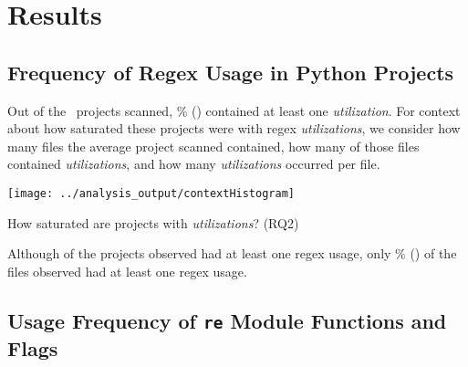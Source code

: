 \section{Results}
\label{sec:results}
\subsection{Frequency of Regex Usage in Python Projects}

Out of the \ projects scanned, \% () contained at least one \emph{utilization}.  For context about how saturated these projects were with regex \emph{utilizations}, we consider how many files the average project scanned contained, how many of those files contained \emph{utilizations}, and how many \emph{utilizations} occurred per file.

\begin{table}[tb]
\centering
\texttt{[image: ../analysis\_output/contextHistogram]}
\caption{How saturated are projects with \emph{utilizations}? (RQ2)}
\label{fig:contextHistogram}
\end{table}



Although  of the projects observed had at least one regex usage, only \% () of the files observed had at least one regex usage.

\subsection{Usage Frequency of {\tt re} Module Functions and Flags}




